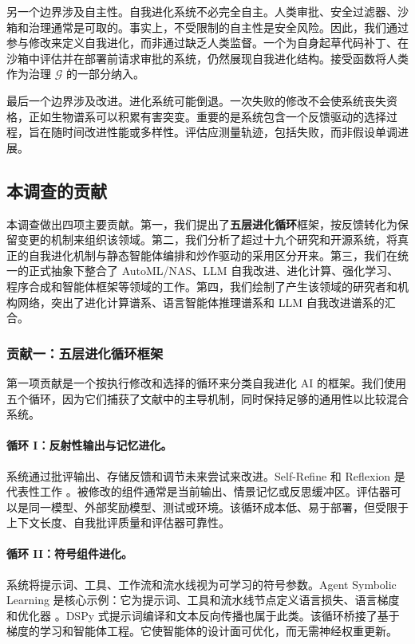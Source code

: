 另一个边界涉及自主性。自我进化系统不必完全自主。人类审批、安全过滤器、沙箱和治理通常是可取的。事实上，不受限制的自主性是安全风险。因此，我们通过参与修改来定义自我进化，而非通过缺乏人类监督。一个为自身起草代码补丁、在沙箱中评估并在部署前请求审批的系统，仍然展现自我进化结构。接受函数将人类作为治理 $\mathcal{G}$ 的一部分纳入。

最后一个边界涉及改进。进化系统可能倒退。一次失败的修改不会使系统丧失资格，正如生物谱系可以积累有害突变。重要的是系统包含一个反馈驱动的选择过程，旨在随时间改进性能或多样性。评估应测量轨迹，包括失败，而非假设单调进展。

\subsection{本调查的贡献}
\label{subsec:intro-contributions}

本调查做出四项主要贡献。第一，我们提出了\textbf{五层进化循环}框架，按反馈转化为保留变更的机制来组织该领域。第二，我们分析了超过十九个研究和开源系统，将真正的自我进化机制与静态智能体编排和炒作驱动的采用区分开来。第三，我们在统一的正式抽象下整合了 AutoML/NAS、LLM 自我改进、进化计算、强化学习、程序合成和智能体框架等领域的工作。第四，我们绘制了产生该领域的研究者和机构网络，突出了进化计算谱系、语言智能体推理谱系和 LLM 自我改进谱系的汇合。

\subsubsection{贡献一：五层进化循环框架}

第一项贡献是一个按执行修改和选择的循环来分类自我进化 AI 的框架。我们使用五个循环，因为它们捕获了文献中的主导机制，同时保持足够的通用性以比较混合系统。

\paragraph{循环 I：反射性输出与记忆进化。} 系统通过批评输出、存储反馈和调节未来尝试来改进。Self-Refine 和 Reflexion 是代表性工作 \cite{selfrefine2023,reflexion2023}。被修改的组件通常是当前输出、情景记忆或反思缓冲区。评估器可以是同一模型、外部奖励模型、测试或环境。该循环成本低、易于部署，但受限于上下文长度、自我批评质量和评估器可靠性。

\paragraph{循环 II：符号组件进化。} 系统将提示词、工具、工作流和流水线视为可学习的符号参数。Agent Symbolic Learning 是核心示例：它为提示词、工具和流水线节点定义语言损失、语言梯度和优化器 \cite{agentsymboliclearning2024}。DSPy 式提示词编译和文本反向传播也属于此类。该循环桥接了基于梯度的学习和智能体工程。它使智能体的设计面可优化，而无需神经权重更新。

